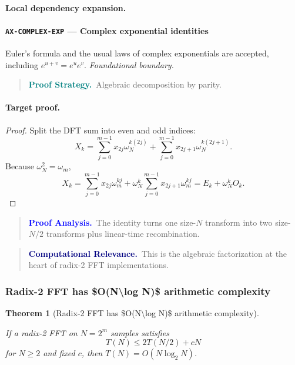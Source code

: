 \documentclass[10pt]{article}
\newcommand{\pidraw}[1]{\begingroup\urlstyle{tt}\nolinkurl{#1}\endgroup}
\newtheorem{theorem}{Theorem}[section]
\theoremstyle{definition}
\theoremstyle{remark}
\newenvironment{proofstrategy}
{\begin{quote}\small\noindent\textbf{\textcolor{teal}{Proof Strategy.}}\ }
{\end{quote}}
\newenvironment{proofanalysis}
{\begin{quote}\small\noindent\textbf{\textcolor{blue}{Proof Analysis.}}\ }
{\end{quote}}
\newenvironment{computationalrelevance}
{\begin{quote}\small\noindent\textbf{\textcolor{navy}{Computational Relevance.}}\ }
{\end{quote}}
\begin{document}
\paragraph{Local dependency expansion.}

\paragraph{\pidraw{AX-COMPLEX-EXP} --- Complex exponential identities}
Euler's formula and the usual laws of complex exponentials are accepted, including $e^{u+v}=e^u e^v$.
\textit{Foundational boundary.}

\begin{proofstrategy}Algebraic decomposition by parity.\end{proofstrategy}

\paragraph{Target proof.}

\begin{proof}

Split the DFT sum into even and odd indices:
\[
X_k=
\sum_{j=0}^{m-1}x_{2j}\omega_N^{k(2j)}
+
\sum_{j=0}^{m-1}x_{2j+1}\omega_N^{k(2j+1)}.
\]
Because $\omega_N^2=\omega_m$,
\[
X_k=
\sum_{j=0}^{m-1}x_{2j}\omega_m^{kj}
+
\omega_N^k\sum_{j=0}^{m-1}x_{2j+1}\omega_m^{kj}
=
E_k+\omega_N^kO_k.
\]

\end{proof}

\begin{proofanalysis}The identity turns one size-$N$ transform into two size-$N/2$ transforms plus linear-time recombination.\end{proofanalysis}

\begin{computationalrelevance}This is the algebraic factorization at the heart of radix-2 FFT implementations.\end{computationalrelevance}

\subsubsection{Radix-2 FFT has \$O(N\textbackslash{}log N)\$ arithmetic complexity}

\begin{theorem}[Radix-2 FFT has \$O(N\textbackslash{}log N)\$ arithmetic complexity]\label{prf:THM-FFT-COMPLEXITY}

If a radix-2 FFT on $N=2^m$ samples satisfies
\[
T(N)\le 2T(N/2)+cN
\]
for $N\ge2$ and fixed $c$, then $T(N)=O(N\log_2N)$.

\end{theorem}
\end{document}
